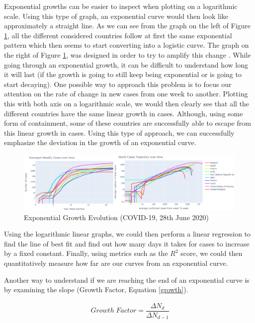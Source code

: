 Exponential growths can be easier to inspect when plotting on a logarithmic scale. Using this type of graph, an exponential curve would then look like approximately a straight line. As we can see from the graph on the left of Figure \ref{exp}, all the different considered countries follow at first the same exponential pattern which then seems to start converting into a logistic curve. The graph on the right of Figure \ref{exp}, was designed in order to try to amplify this change \cite{physics}. While going through an exponential growth, it can be difficult to understand how long it will last (if the growth is going to still keep being exponential or is going to start decaying). One possible way to approach this problem is to focus our attention on the rate of change in new cases from one week to another. Plotting this with both axis on a logarithmic scale, we would then clearly see that all the different countries have the same linear growth in cases. Although, using some form of containment, some of these countries are successfully able to escape from this linear growth in cases. Using this type of approach, we can successfully emphasize the deviation in the growth of an exponential curve.

\begin{figure}[ht!]%
    \centering
    \includegraphics[width=1\linewidth]{latex/images/logplot.pdf}
    \caption{Exponential Growth Evolution (COVID-19, 28th June 2020)}
    \label{exp}
\end{figure}

Using the logarithmic linear graphs, we could then perform a linear regression to find the line of best fit and find out how many days it takes for cases to increase by a fixed constant. Finally, using metrics such as the $R^{2}$ score, we could then quantitatively measure how far are our curves from an exponential curve.

Another way to understand if we are reaching the end of an exponential curve is by examining the slope (Growth Factor, Equation \ref{growth}).

\useshortskip
\begin{align}
\ Growth \; Factor = \dfrac{\Delta N_{d}}{\Delta N_{d-1}}
\label{growth}
\end{align}
\useshortskip

